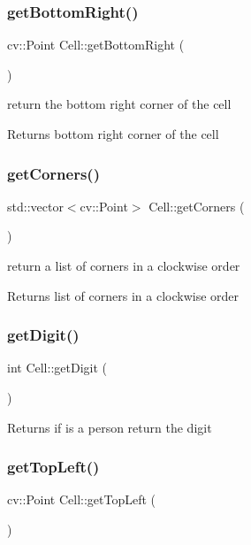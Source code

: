 \subsubsection{\texorpdfstring{get\+Bottom\+Right()}{getBottomRight()}}
{\footnotesize\ttfamily cv\+::\+Point Cell\+::get\+Bottom\+Right (\begin{DoxyParamCaption}{ }\end{DoxyParamCaption})}

return the bottom right corner of the cell \begin{DoxyReturn}{Returns}
bottom right corner of the cell 
\end{DoxyReturn}
\mbox{\label{class_cell_a03becce6b307d86848e9563eb08ac2b3}} 
\subsubsection{\texorpdfstring{get\+Corners()}{getCorners()}}
{\footnotesize\ttfamily std\+::vector$<$cv\+::\+Point$>$ Cell\+::get\+Corners (\begin{DoxyParamCaption}{ }\end{DoxyParamCaption})}

return a list of corners in a clockwise order \begin{DoxyReturn}{Returns}
list of corners in a clockwise order 
\end{DoxyReturn}
\mbox{\label{class_cell_a335c410074aaac9bb5594ea8adf648ff}} 
\subsubsection{\texorpdfstring{get\+Digit()}{getDigit()}}
{\footnotesize\ttfamily int Cell\+::get\+Digit (\begin{DoxyParamCaption}{ }\end{DoxyParamCaption})}

\begin{DoxyReturn}{Returns}
if is a person return the digit 
\end{DoxyReturn}
\mbox{\label{class_cell_ac6e9338748b2098e034641c88a977b23}} 
\subsubsection{\texorpdfstring{get\+Top\+Left()}{getTopLeft()}}
{\footnotesize\ttfamily cv\+::\+Point Cell\+::get\+Top\+Left (\begin{DoxyParamCaption}{ }\end{DoxyParamCaption})}

